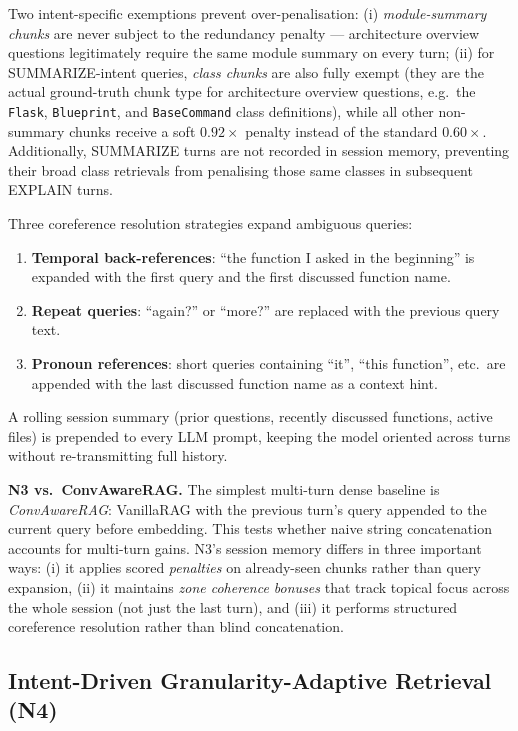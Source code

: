 \documentclass[runningheads]{llncs}
\begin{document}
Two intent-specific exemptions prevent over-penalisation: (i)
\emph{module-summary chunks} are never subject to the redundancy
penalty --- architecture overview questions legitimately require
the same module summary on every turn; (ii) for SUMMARIZE-intent
queries, \emph{class chunks} are also fully exempt (they are the
actual ground-truth chunk type for architecture overview questions,
e.g.\ the \texttt{Flask}, \texttt{Blueprint}, and
\texttt{BaseCommand} class definitions), while all other
non-summary chunks receive a soft $0.92\times$ penalty instead of
the standard $0.60\times$. Additionally, SUMMARIZE turns are not
recorded in session memory, preventing their broad class retrievals
from penalising those same classes in subsequent EXPLAIN turns.

Three coreference resolution strategies expand ambiguous queries:
\begin{enumerate}[label=(\roman*),leftmargin=*]
  \item \textbf{Temporal back-references}: ``the function I asked
        in the beginning'' is expanded with the first query and the
        first discussed function name.
  \item \textbf{Repeat queries}: ``again?'' or ``more?'' are
        replaced with the previous query text.
  \item \textbf{Pronoun references}: short queries containing
        ``it'', ``this function'', etc.\ are appended with the last
        discussed function name as a context hint.
\end{enumerate}
A rolling session summary (prior questions, recently discussed
functions, active files) is prepended to every LLM prompt, keeping
the model oriented across turns without re-transmitting full
history.

\textbf{N3 vs.\ ConvAwareRAG.} The simplest multi-turn dense
baseline is \emph{ConvAwareRAG}: VanillaRAG with the previous
turn's query appended to the current query before embedding. This
tests whether naive string concatenation accounts for multi-turn
gains. N3's session memory differs in three important ways: (i) it
applies scored \emph{penalties} on already-seen chunks rather than
query expansion, (ii) it maintains \emph{zone coherence bonuses}
that track topical focus across the whole session (not just the
last turn), and (iii) it performs structured coreference
resolution rather than blind concatenation.

\subsection{Intent-Driven Granularity-Adaptive Retrieval (N4)}
\end{document}
